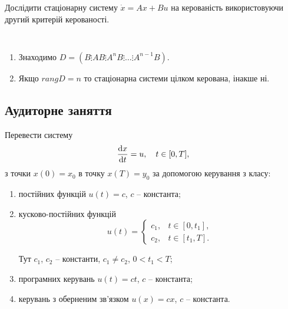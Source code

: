 \begin{problem*}
	Дослідити стаціонарну систему $\dot x = A x + B u$ на керованість використовуючи другий критерій керованості.
\end{problem*}

\begin{algorithm} \tt
	\begin{enumerate}
		\item Знаходимо $D = \left(B \vdots AB \vdots A^nB \vdots\ldots\vdots A^{n-1}B\right)$.
		\item Якщо $rang D = n$ то стаціонарна системи цілком керована, інакше ні.
	\end{enumerate}
\end{algorithm}


\newpage

\subsection{Аудиторне заняття}

\begin{problem}
	Перевести систему \[ \frac{\mathop{}\!\mathrm{d} x}{\mathop{}\!\mathrm{d} t} = u, \quad t \in [0, T], \] з точки $x (0) = x_0$ в точку $x (T) = y_0$ за допомогою керування з класу:
	\begin{enumerate}
		\item постійних функцій $u (t) = c$, $c$ -- константа;

		\item кусково-постійних функцій \[ u (t) = \begin{cases} c_1, & t \in [0, t_1], \\ c_2, & t \in [t_1, T]. \end{cases} \]

		Тут $c_1$, $c_2$ -- константи, $c_1 \ne c_2$, $0 < t_1 < T$;

		\item програмних керувань $u(t) = c t$, $c$ -- константа;

		\item керувань з оберненим зв'язком $u(x) = c x$, $c$ -- константа.
	\end{enumerate}
\end{problem}

